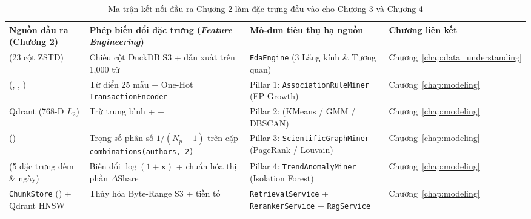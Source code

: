 \begin{table}[htbp]
  \centering
  \small
  \caption[Ma trận kết nối đầu ra Chương 2 làm đặc trưng cho Chương 3 và Chương 4]{Ma trận kết nối đầu ra Chương 2 làm đặc trưng đầu vào cho Chương 3 và Chương 4}
  \label{tab:ch2_feature_bridge}
  \setlength{\tabcolsep}{3.5pt}
  \begin{tabularx}{\linewidth}{|>{\raggedright\arraybackslash}p{31mm}|>{\raggedright\arraybackslash}p{46mm}|>{\raggedright\arraybackslash}p{41mm}|L|}
    \hline
    \textbf{Nguồn đầu ra (Chương 2)} & \textbf{Phép biến đổi đặc trưng (\textit{Feature Engineering})} & \textbf{Mô-đun tiêu thụ hạ nguồn} & \textbf{Chương liên kết} \\
    \hline
     (23 cột ZSTD) & Chiếu cột DuckDB S3 + dẫn xuất  trên 1,000 từ & \texttt{EdaEngine} (3 Lăng kính \& Tương quan) & Chương~\ref{chap:data_understanding} \\
    \hline
     (, , ) & Từ điển 25 mẫu  + One-Hot \texttt{TransactionEncoder} & Pillar 1: \texttt{AssociationRuleMiner} (FP-Growth) & Chương~\ref{chap:modeling} \\
    \hline
    Qdrant  (768-D $L_2$) & Trừ trung bình +  +  & Pillar 2:  (KMeans / GMM / DBSCAN) & Chương~\ref{chap:modeling} \\
    \hline
     () & Trọng số phân số $1/(N_p - 1)$ trên cặp \texttt{combinations(authors, 2)} & Pillar 3: \texttt{ScientificGraphMiner} (PageRank / Louvain) & Chương~\ref{chap:modeling} \\
    \hline
     (5 đặc trưng đếm \& ngày) & Biến đổi $\log(1 + \mathbf{x})$ + chuẩn hóa thị phần $\Delta\text{Share}$ & Pillar 4: \texttt{TrendAnomalyMiner} (Isolation Forest) & Chương~\ref{chap:modeling} \\
    \hline
    \texttt{ChunkStore} () + Qdrant HNSW & Thủy hóa Byte-Range S3 + tiền tố  & \texttt{RetrievalService} + \texttt{RerankerService} + \texttt{RagService} & Chương~\ref{chap:modeling} \\
    \hline
  \end{tabularx}
\end{table}
\FloatBarrier
